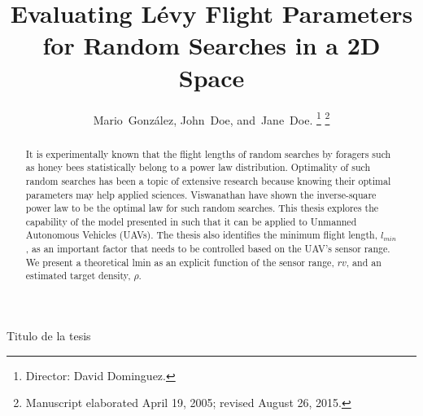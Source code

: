 \documentclass[journal,onecolumn,twoside]{IEEEtran}
\begin{document}
%
\title{Evaluating Lévy Flight Parameters for
Random Searches in a 2D Space}
%
%
%

\author{Mario~González, %
        John~Doe, %
        and~Jane~Doe. %
\thanks{Director: David Dominguez.}%
\thanks{Manuscript elaborated April 19, 2005; revised August 26, 2015.}}



%
{Titulo de la tesis}




\maketitle

\begin{abstract}
It is experimentally known that the 
flight lengths of random searches by 
foragers such as honey bees statistically 
belong to a power law distribution.
Optimality of such random searches has been 
a topic of extensive research because 
knowing their optimal parameters may help applied sciences. 
Viswanathan have shown the inverse-square power law 
to be the optimal law for such random searches. 
%
This thesis explores the capability of the model 
presented in such that it can be applied to 
Unmanned Autonomous Vehicles
(UAVs). The thesis also identifies the minimum 
flight length, $l_{min}$, as an important factor 
that needs to be controlled based on the UAV’s 
sensor range.
We present a theoretical lmin as an explicit 
function of the sensor range, $rv$,
and an estimated target density, $\rho$.
\end{abstract}
\end{document}
